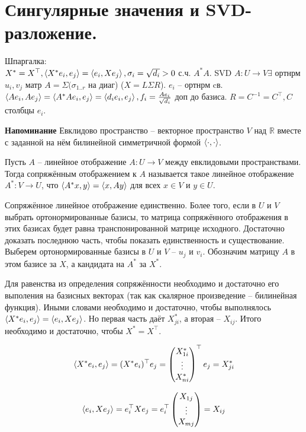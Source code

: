 \section{
Сингулярные значения и SVD-разложение.
}

Шпаргалка:\\
$X^* = X^{\top}, \left\langle X^*e_i, e_j\right\rangle = \left\langle e_i, Xe_j\right\rangle, \sigma_i = \sqrt{d_i} > 0$ с.ч. $A^*A$. SVD $A \colon U \to V \exists$ ортнрм $u_i, v_j$ матр $A = \Sigma(\sigma_{1..r}$ на диаг) ($X = L\Sigma R$). $e_i$ -- ортнрм cв. $\left\langle Ae_i, Ae_j\right\rangle = \left\langle A^*Ae_i, e_j\right\rangle = \left\langle d_ie_i, e_j\right\rangle, f_i = \frac{Ae_i}{\sqrt{d_i}}$ доп до базиса. $R = C^{-1} = C^{\top}, C$ столбцы $e_i$.

{\bf Напоминание} Евклидово пространство -- векторное пространство $V$ над $\mathbb{R}$ вместе с заданной на нём билинейной симметричной формой $\left\langle \cdot, \cdot\right\rangle$.

\dfn Пусть $A$ -- линейное отображение $A\colon U \to V$ между евклидовыми пространствами. Тогда сопряжённым отображением к $A$ называется такое линейное отображение $A^{*}\colon V \to U$, что $\left\langle A^*x,y\right\rangle = \left\langle x,Ay\right\rangle$ для всех $x\in V$ и $y \in U$.
\edfn

\thrm Сопряжённое линейное отображение единственно. Более того, если в $U$ и $V$ выбрать ортонормированные базисы, то матрица сопряжённого отображения в этих базисах будет равна транспонированной матрице исходного.
\proof Достаточно доказать последнюю часть, чтобы показать единственность и существование. Выберем ортонормированные базисы в $U$ и $V$ -- $u_j$ и $v_i$. Обозначим матрицу $A$ в этом базисе за $X$, а кандидата на $A^*$ за $X^*$.

Для равенства из определения сопряжённости необходимо и достаточно его выполения на базисных векторах (так как скалярное произведение -- билинейная функция). Иными словами необходимо и достаточно, чтобы выполнялось $\left\langle X^{*}e_i,e_j\right\rangle=\left\langle e_i,Xe_j\right\rangle$. Но первая часть даёт $X^{*}_{ji}$, а вторая -- $X_{ij}$. Итого необходимо и достаточно, чтобы $X^{*}=X^{\top}$.

$$\left\langle X^{*}e_i,e_j\right\rangle=(X^*e_i)^{\top}e_j = \begin{pmatrix} X^*_{1i}\\
 \vdots\\
 X^*_{ni} \end{pmatrix}^{\top}e_j = X^*_{ji}$$
 
 $$\left\langle e_i,Xe_j\right\rangle=e_i^{\top}Xe_j = e_i^{\top}\begin{pmatrix} X_{1j}\\
 \vdots\\
 X_{mj} \end{pmatrix} = X_{ij}$$

\endproof
\ethrm


